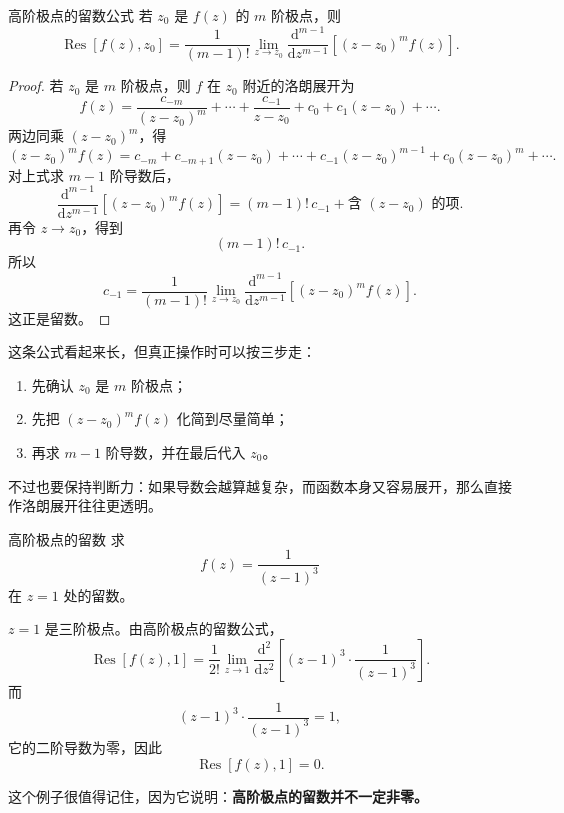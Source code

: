 \begin{dingli}{高阶极点的留数公式}{}
若 $z_0$ 是 $f(z)$ 的 $m$ 阶极点，则
\[
    \operatorname{Res}[f(z),z_0]
    =
    \frac{1}{(m-1)!}
    \lim_{z\to z_0}
    \frac{\mathrm{d}^{m-1}}{\mathrm{d}z^{m-1}}
    \left[(z-z_0)^m f(z)\right].
\]
\end{dingli}

\begin{proof}
若 $z_0$ 是 $m$ 阶极点，则 $f$ 在 $z_0$ 附近的洛朗展开为
\[
    f(z)
    =
    \frac{c_{-m}}{(z-z_0)^m}
    +\cdots
    +\frac{c_{-1}}{z-z_0}
    +c_0+c_1(z-z_0)+\cdots.
\]
两边同乘 $(z-z_0)^m$，得
\[
    (z-z_0)^m f(z)
    =
    c_{-m}
    +c_{-m+1}(z-z_0)
    +\cdots
    +c_{-1}(z-z_0)^{m-1}
    +c_0(z-z_0)^m+\cdots.
\]
对上式求 $m-1$ 阶导数后，
\[
    \frac{\mathrm{d}^{m-1}}{\mathrm{d}z^{m-1}}\left[(z-z_0)^m f(z)\right]
    =
    (m-1)!\,c_{-1}
    +\text{含 }(z-z_0)\text{ 的项}.
\]
再令 $z\to z_0$，得到
\[
    (m-1)!\, c_{-1}.
\]
所以
\[
    c_{-1}
    =
    \frac{1}{(m-1)!}
    \lim_{z\to z_0}
    \frac{\mathrm{d}^{m-1}}{\mathrm{d}z^{m-1}}
    \left[(z-z_0)^m f(z)\right].
\]
这正是留数。
\end{proof}

\begin{tishi}[高阶极点公式怎么落到计算上]
这条公式看起来长，但真正操作时可以按三步走：
\begin{enumerate}
    \item 先确认 $z_0$ 是 $m$ 阶极点；
    \item 先把 $(z-z_0)^m f(z)$ 化简到尽量简单；
    \item 再求 $m-1$ 阶导数，并在最后代入 $z_0$。
\end{enumerate}
不过也要保持判断力：如果导数会越算越复杂，而函数本身又容易展开，那么直接作洛朗展开往往更透明。
\end{tishi}

\begin{lizi}{高阶极点的留数}{}
求
\[
    f(z)=\frac{1}{(z-1)^3}
\]
在 $z=1$ 处的留数。

\begin{jie}
$z=1$ 是三阶极点。由高阶极点的留数公式，
\[
    \operatorname{Res}[f(z),1]
    =
    \frac{1}{2!}
    \lim_{z\to 1}
    \frac{\mathrm{d}^2}{\mathrm{d}z^2}
    \left[(z-1)^3\cdot \frac{1}{(z-1)^3}\right].
\]
而
\[
    (z-1)^3\cdot \frac{1}{(z-1)^3}=1,
\]
它的二阶导数为零，因此
\[
    \operatorname{Res}[f(z),1]=0.
\]

这个例子很值得记住，因为它说明：\textbf{高阶极点的留数并不一定非零。}
\end{jie}
\end{lizi}

